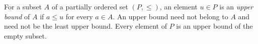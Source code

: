 
For a subset $A$ of a partially ordered set $(P,\le)$, an element $u\in P$ is an \emph{upper bound} of $A$ if $a\le u$ for every $a\in A$. An upper bound need not belong to $A$ and need not be the least upper bound. Every element of $P$ is an upper bound of the empty subset.
